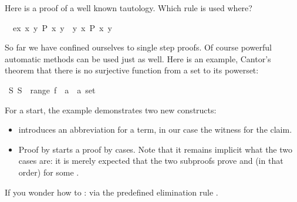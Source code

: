 \begin{isabellebody}
\begin{isamarkuptext}
Here is a proof of a well known tautology.
Which rule is used where?%
\end{isamarkuptext}%
\isamarkuptrue%
\ \ ex{\isacharcolon}\ {\isachardoublequote}{\isasymexists}x{\isachardot}\ {\isasymforall}y{\isachardot}\ P\ x\ y{\isachardoublequote}\ \ {\isachardoublequote}{\isasymforall}y{\isachardot}\ {\isasymexists}x{\isachardot}\ P\ x\ y{\isachardoublequote}\isanewline
\isamarkupfalse%
\isamarkupfalse%
\isamarkupfalse%
\isamarkupfalse%
\isamarkupfalse%
\isamarkupfalse%
\isamarkupfalse%
\isamarkupfalse%
\isamarkupfalse%
\isamarkupfalse%
\isamarkupfalse%
%
\isamarkuptrue%
%
\begin{isamarkuptext}%
So far we have confined ourselves to single step proofs. Of course
powerful automatic methods can be used just as well. Here is an example,
Cantor's theorem that there is no surjective function from a set to its
powerset:%
\end{isamarkuptext}%
\isamarkuptrue%
\ {\isachardoublequote}{\isasymexists}S{\isachardot}\ S\ {\isasymnotin}\ range\ {\isacharparenleft}f\ {\isacharcolon}{\isacharcolon}\ {\isacharprime}a\ {\isasymRightarrow}\ {\isacharprime}a\ set{\isacharparenright}{\isachardoublequote}\isanewline
\isamarkupfalse%
\isamarkupfalse%
\isamarkupfalse%
\isamarkupfalse%
\isamarkupfalse%
\isamarkupfalse%
\isamarkupfalse%
\isamarkupfalse%
\isamarkupfalse%
\isamarkupfalse%
\isamarkupfalse%
\isamarkupfalse%
\isamarkupfalse%
\isamarkupfalse%
\isamarkupfalse%
\isamarkupfalse%
\isamarkupfalse%
\isamarkupfalse%
\isamarkupfalse%
\isamarkupfalse%
\isamarkupfalse%
\isamarkupfalse%
\isamarkupfalse%
%
\begin{isamarkuptext}%
\noindent
For a start, the example demonstrates two new constructs:
\begin{itemize}
\item {} introduces an abbreviation for a term, in our case
the witness for the claim.
\item Proof by  starts a proof by cases. Note that it remains
implicit what the two cases are: it is merely expected that the two subproofs
prove  and  (in that order)
for some .
\end{itemize}
If you wonder how to  :
via the predefined elimination rule .


\end{isamarkuptext}
\end{isabellebody}
